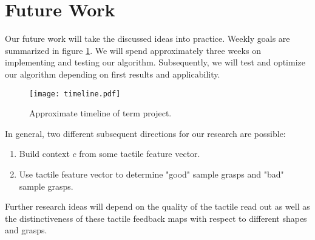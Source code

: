 \renewcommand{\thesection}{\Roman{section}}
\section{Future Work}
Our future work will take the discussed ideas into practice. Weekly goals are summarized in figure \ref{timeline}. We will spend approximately three weeks on implementing and testing our algorithm. Subsequently, we will test and optimize our algorithm depending on first results and applicability. 

\begin{figure}[h]
	\centering
	\texttt{[image: timeline.pdf]}	
	\caption{Approximate timeline of term project.}
	\label{timeline}
\end{figure}

In general, two different subsequent directions for our research are possible:
\begin{enumerate}
\item Build context $c$ from some tactile feature vector.
\item Use tactile feature vector to determine "good" sample grasps and "bad" sample grasps.
\end{enumerate}
Further research ideas will depend on the quality of the tactile read out as well as the distinctiveness of these tactile feedback maps with respect to different shapes and grasps. 



\newpage







 
                    

